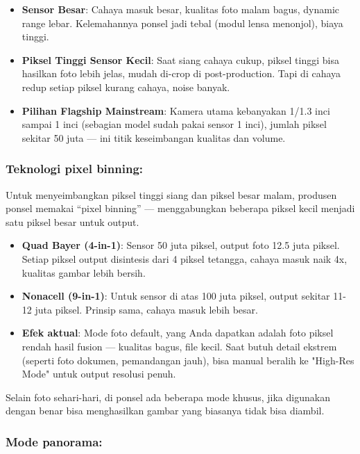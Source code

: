 \begin{itemize}
  \item \textbf{Sensor Besar}: Cahaya masuk besar, kualitas foto malam bagus, dynamic range lebar. Kelemahannya ponsel jadi tebal (modul lensa menonjol), biaya tinggi.
  \item \textbf{Piksel Tinggi Sensor Kecil}: Saat siang cahaya cukup, piksel tinggi bisa hasilkan foto lebih jelas, mudah di-crop di post-production. Tapi di cahaya redup setiap piksel kurang cahaya, noise banyak.
  \item \textbf{Pilihan Flagship Mainstream}: Kamera utama kebanyakan 1/1.3 inci sampai 1 inci (sebagian model sudah pakai sensor 1 inci), jumlah piksel sekitar 50 juta — ini titik keseimbangan kualitas dan volume.
\end{itemize}

\subsubsection*{Teknologi pixel binning:}

Untuk menyeimbangkan piksel tinggi siang dan piksel besar malam, produsen ponsel memakai “pixel binning” — menggabungkan beberapa piksel kecil menjadi satu piksel besar untuk output.

\begin{itemize}
  \item \textbf{Quad Bayer (4-in-1)}: Sensor 50 juta piksel, output foto 12.5 juta piksel. Setiap piksel output disintesis dari 4 piksel tetangga, cahaya masuk naik 4x, kualitas gambar lebih bersih.
  \item \textbf{Nonacell (9-in-1)}: Untuk sensor di atas 100 juta piksel, output sekitar 11-12 juta piksel. Prinsip sama, cahaya masuk lebih besar.
  \item \textbf{Efek aktual}: Mode foto default, yang Anda dapatkan adalah foto piksel rendah hasil fusion — kualitas bagus, file kecil. Saat butuh detail ekstrem (seperti foto dokumen, pemandangan jauh), bisa manual beralih ke "High-Res Mode" untuk output resolusi penuh.
\end{itemize}


Selain foto sehari-hari, di ponsel ada beberapa mode khusus, jika digunakan dengan benar bisa menghasilkan gambar yang biasanya tidak bisa diambil.

\subsubsection*{Mode panorama:}

